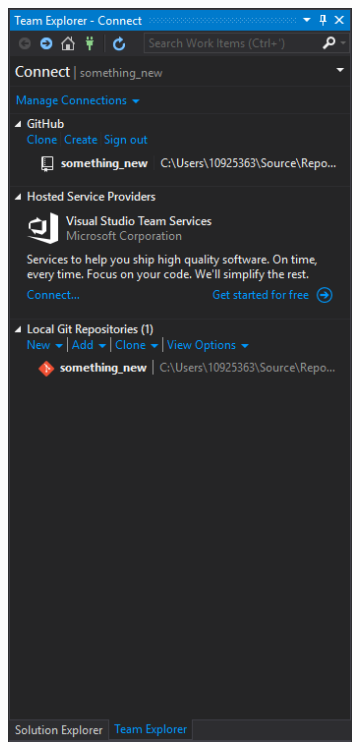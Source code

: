 \documentclass[12pt]{article}
\begin{document}
\begin{figure}[!ht]
	\centering
	\begin{subfigure}[t]{0.45\textwidth}
		\includegraphics[width=\textwidth]{team_explorer.png}

\end{subfigure}
\end{figure}
\end{document}
